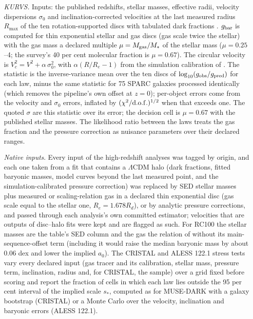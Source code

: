 \documentclass[fleqn,usenatbib]{mnras}
\begin{document}
\emph{KURVS.} Inputs: the published redshifts, stellar masses, effective radii, velocity dispersions $\sigma_0$ and inclination-corrected velocities at the last measured radius $R_{\max}$ of the ten rotation-supported discs with tabulated dark fractions \citep{Puglisi2023}. $g_{\rm bar}$ is computed for thin exponential stellar and gas discs (gas scale twice the stellar) with the gas mass a declared multiple $\mu=M_{\rm gas}/M_*$ of the stellar mass ($\mu=0.25$--4; the survey's 40 per cent molecular fraction is $\mu=0.67$). The circular velocity is $V_c^2=V^2+\alpha\,\sigma_0^2$, with $\alpha(R/R_e-1)$ from the simulation calibration of \citet{Kretschmer2021}. The statistic is the inverse-variance mean over the ten discs of $\log_{10}(g_{\rm obs}/g_{\rm pred})$ for each law, minus the same statistic for 75 SPARC galaxies processed identically (which removes the pipeline's own offset at $z=0$); per-object errors come from the velocity and $\sigma_0$ errors, inflated by $(\chi^2/{\rm d.o.f.})^{1/2}$ when that exceeds one. The quoted $\sigma$ are this statistic over its error; the decision cell is $\mu=0.67$ with the published stellar masses. The likelihood ratio between the laws treats the gas fraction and the pressure correction as nuisance parameters over their declared ranges.

\emph{Native inputs.} Every input of the high-redshift analyses was tagged by origin, and each one taken from a fit that contains a $\Lambda$CDM halo (dark fractions, fitted baryonic masses, model curves beyond the last measured point, and the simulation-calibrated pressure correction) was replaced by SED stellar masses plus measured or scaling-relation gas in a declared thin exponential disc (gas scale equal to the stellar one, $R_e=1.678R_d$), or by analytic pressure corrections, and passed through each analysis's own committed estimator; velocities that are outputs of disc--halo fits were kept and are flagged as such. For RC100 the stellar masses are the table's SED column and the gas the relation of \citet{Tacconi2018} without its main-sequence-offset term (including it would raise the median baryonic mass by about 0.06 dex and lower the implied $a_0$). The CRISTAL and ALESS 122.1 stress tests vary every declared input (gas tracer and its calibration, stellar mass, pressure term, inclination, radius and, for CRISTAL, the sample) over a grid fixed before scoring and report the fraction of cells in which each law lies outside the 95 per cent interval of the implied scale $s_*$, computed as for MUSE-DARK with a galaxy bootstrap (CRISTAL) or a Monte Carlo over the velocity, inclination and baryonic errors (ALESS 122.1).
\end{document}
